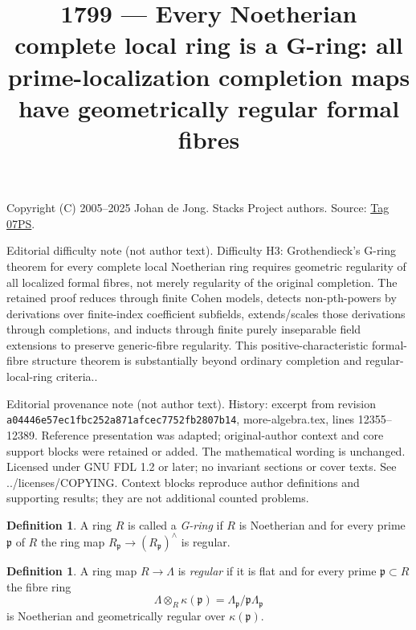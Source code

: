 \documentclass{amsart}
\theoremstyle{plain}
\theoremstyle{definition}
\newtheorem{definition}[subsection]{Definition}
\theoremstyle{remark}
\numberwithin{equation}{subsection}
\begin{document}
\title[Stacks Project, Tag 07PS]{1799 --- Every Noetherian complete local ring is a G-ring: all prime-localization completion maps have geometrically regular formal fibres}
\maketitle
\noindent Copyright (C) 2005--2025 Johan de Jong. Stacks Project authors. Source: \href{https://stacks.math.columbia.edu/tag/07PS}{Tag 07PS}.

\noindent Editorial difficulty note (not author text). Difficulty H3: Grothendieck\textquoteright{}s G-ring theorem for every complete local Noetherian ring requires geometric regularity of all localized formal fibres, not merely regularity of the original completion. The retained proof reduces through finite Cohen models, detects non-pth-powers by derivations over finite-index coefficient subfields, extends/scales those derivations through completions, and inducts through finite purely inseparable field extensions to preserve generic-fibre regularity. This positive-characteristic formal-fibre structure theorem is substantially beyond ordinary completion and regular-local-ring criteria..

\noindent Editorial provenance note (not author text). History: excerpt from revision \texttt{a0444\allowbreak 6e57e\allowbreak c1fbc\allowbreak 252a8\allowbreak 71afc\allowbreak ec775\allowbreak 2fb28\allowbreak 07b14}, more-algebra.tex, lines 12355--12389. Reference presentation was adapted; original-author context and core support blocks were retained or added. The mathematical wording is unchanged. Licensed under GNU FDL 1.2 or later; no invariant sections or cover texts. See ../licenses/COPYING. Context blocks reproduce author definitions and supporting results; they are not additional counted problems.

\begin{definition}
\label{definition-G-ring}
A ring $R$ is called a {\it G-ring} if $R$ is Noetherian and for every
prime $\mathfrak p$ of $R$ the ring map
$R_\mathfrak p \to (R_\mathfrak p)^\wedge$ is regular.
\end{definition}

\begin{definition}
\label{definition-regular}
A ring map $R \to \Lambda$ is {\it regular} if it is flat and
for every prime $\mathfrak p \subset R$ the fibre ring
$$
\Lambda \otimes_R \kappa(\mathfrak p) =
\Lambda_\mathfrak p/\mathfrak p\Lambda_\mathfrak p
$$
is Noetherian and geometrically regular over $\kappa(\mathfrak p)$.
\end{definition}
\end{document}

